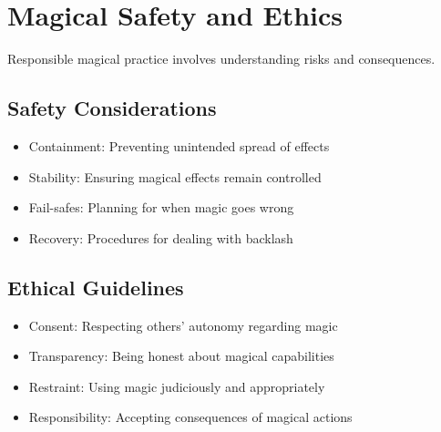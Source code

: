 \documentclass[11pt,twoside,openany]{book}
\begin{document}
\section*{Magical Safety and Ethics} 

Responsible magical practice involves understanding risks and consequences.

\subsection*{Safety Considerations}

\begin{itemize}
\item Containment: Preventing unintended spread of effects
\item Stability: Ensuring magical effects remain controlled
\item Fail-safes: Planning for when magic goes wrong
\item Recovery: Procedures for dealing with backlash
\end{itemize}

\subsection*{Ethical Guidelines}

\begin{itemize}
\item Consent: Respecting others' autonomy regarding magic
\item Transparency: Being honest about magical capabilities
\item Restraint: Using magic judiciously and appropriately
\item Responsibility: Accepting consequences of magical actions
\end{itemize}
\end{document}
